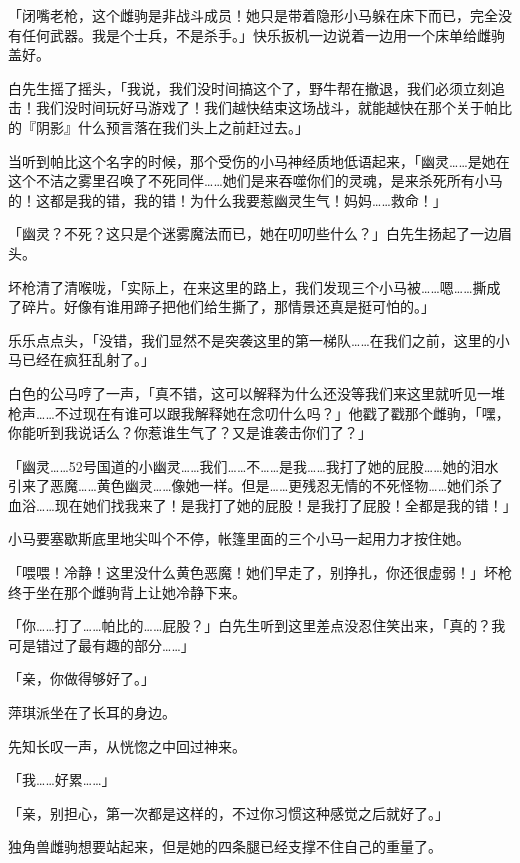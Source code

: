 「闭嘴老枪，这个雌驹是非战斗成员！她只是带着隐形小马躲在床下而已，完全没有任何武器。我是个士兵，不是杀手。」快乐扳机一边说着一边用一个床单给雌驹盖好。

白先生摇了摇头，「我说，我们没时间搞这个了，野牛帮在撤退，我们必须立刻追击！我们没时间玩好马游戏了！我们越快结束这场战斗，就能越快在那个关于帕比的『阴影』什么预言落在我们头上之前赶过去。」

当听到帕比这个名字的时候，那个受伤的小马神经质地低语起来，「幽灵……是她在这个不洁之雾里召唤了不死同伴……她们是来吞噬你们的灵魂，是来杀死所有小马的！这都是我的错，我的错！为什么我要惹幽灵生气！妈妈……救命！」

「幽灵？不死？这只是个迷雾魔法而已，她在叨叨些什么？」白先生扬起了一边眉头。

坏枪清了清喉咙，「实际上，在来这里的路上，我们发现三个小马被……嗯……撕成了碎片。好像有谁用蹄子把他们给生撕了，那情景还真是挺可怕的。」

乐乐点点头，「没错，我们显然不是突袭这里的第一梯队……在我们之前，这里的小马已经在疯狂乱射了。」

白色的公马哼了一声，「真不错，这可以解释为什么还没等我们来这里就听见一堆枪声……不过现在有谁可以跟我解释她在念叨什么吗？」他戳了戳那个雌驹，「嘿，你能听到我说话么？你惹谁生气了？又是谁袭击你们了？」

「幽灵……52号国道的小幽灵……我们……不……是我……我打了她的屁股……她的泪水引来了恶魔……黄色幽灵……像她一样。但是……更残忍无情的不死怪物……她们杀了血浴……现在她们找我来了！是我打了她的屁股！是我打了屁股！全都是我的错！」

小马要塞歇斯底里地尖叫个不停，帐篷里面的三个小马一起用力才按住她。

「喂喂！冷静！这里没什么黄色恶魔！她们早走了，别挣扎，你还很虚弱！」坏枪终于坐在那个雌驹背上让她冷静下来。

「你……打了……帕比的……屁股？」白先生听到这里差点没忍住笑出来，「真的？我可是错过了最有趣的部分……」

\horizonline


「亲，你做得够好了。」

萍琪派坐在了长耳的身边。

先知长叹一声，从恍惚之中回过神来。

「我……好累……」

「亲，别担心，第一次都是这样的，不过你习惯这种感觉之后就好了。」

独角兽雌驹想要站起来，但是她的四条腿已经支撑不住自己的重量了。

